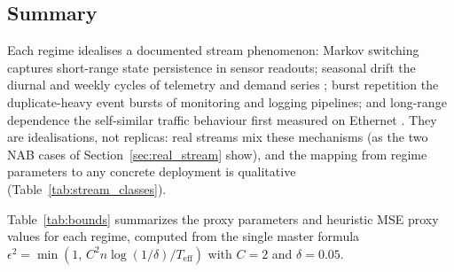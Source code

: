 \documentclass[sensors,article,submit,pdftex,moreauthors]{Definitions/mdpi}
\newcommand{\Teff}{T_{\mathrm{eff}}}
\providecommand{\DIFadd}[1]{{\protect\color{blue}#1}} %
\providecommand{\DIFdel}[1]{} %
\providecommand{\DIFaddbegin}{} %
\providecommand{\DIFaddend}{} %
\providecommand{\DIFdelbegin}{} %
\providecommand{\DIFdelend}{} %
\begin{document}
\subsection{Summary}

\DIFdelbegin \DIFdel{Table~}\DIFdelend \DIFaddbegin \DIFadd{Each regime idealises a documented stream phenomenon: Markov switching captures short-range state persistence in sensor readouts; seasonal drift the diurnal and weekly cycles of telemetry and demand series }\citep{gama2014driftsurvey, arora2024driftreview}\DIFadd{; burst repetition the duplicate-heavy event bursts of monitoring and logging pipelines; and long-range dependence the self-similar traffic behaviour first measured on Ethernet }\citep{leland1994ethernet, willinger1997selfsimilarity}\DIFadd{. They are idealisations, not replicas: real streams mix these mechanisms (as the two NAB cases of Section~\ref{sec:real_stream} show), and the mapping from regime parameters to any concrete deployment is qualitative (Table~\ref{tab:stream_classes}).
}

\DIFadd{Table~}\DIFaddend \ref{tab:bounds} summarizes the proxy parameters and heuristic MSE proxy values for each regime, computed from the single master formula $\epsilon^2 = \min(1,\, C^2 n \log(1/\delta) / \Teff)$ with $C = 2$ and $\delta = 0.05$.
\end{document}
